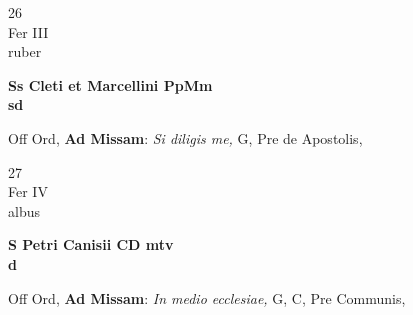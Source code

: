 \documentclass[10pt, openany]{book}
\begin{document}
        \begin{center}
            \begin{minipage}{3.5in}
                \vspace{2em}
                \begin{minipage}{0.5in}
                    {\Huge 26} \\
                    {\normalsize Fer III} \\
                    {\normalsize ruber}
                \end{minipage}
                \begin{minipage}{3.0in}
                    \textbf{ \large Ss Cleti et Marcellini PpMm \\
                    \textnormal{\normalsize sd}} \\ 
                \end{minipage}
                \begin{justify}Off Ord, \textbf{Ad Missam}: \textit{Si diligis me,} G, Pre de Apostolis,  
                \end{justify}
            \end{minipage}
        \end{center}
    
        \begin{center}
            \begin{minipage}{3.5in}
                \vspace{2em}
                \begin{minipage}{0.5in}
                    {\Huge 27} \\
                    {\normalsize Fer IV} \\
                    {\normalsize albus}
                \end{minipage}
                \begin{minipage}{3.0in}
                    \textbf{ \large S Petri Canisii CD mtv \\
                    \textnormal{\normalsize d}} \\ 
                \end{minipage}
                \begin{justify}Off Ord, \textbf{Ad Missam}: \textit{In medio ecclesiae,} G, C, Pre Communis,  
                \end{justify}
            \end{minipage}
        \end{center}
    
\end{document}

